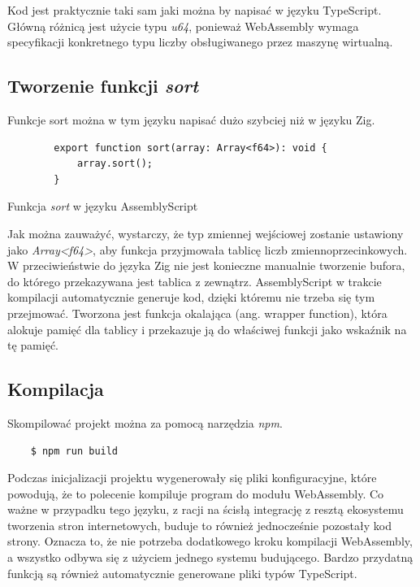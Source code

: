 \documentclass[language=polish,type=master]{aghmodern}
\begin{document}
Kod jest praktycznie taki sam jaki można by napisać w języku TypeScript.
Główną różnicą jest użycie typu \emph{u64}, ponieważ WebAssembly wymaga specyfikacji konkretnego typu liczby obsługiwanego przez maszynę wirtualną.

\subsection{Tworzenie funkcji \emph{sort}}

Funkcje sort można w tym języku napisać dużo szybciej niż w języku Zig.

\begin{listing}[H]
    \begin{verbatim}
        export function sort(array: Array<f64>): void {
            array.sort();
        }
    \end{verbatim}
    \caption{Funkcja \emph{sort} w języku AssemblyScript}
\end{listing}

Jak można zauważyć, wystarczy, że typ zmiennej wejściowej zostanie ustawiony jako \emph{Array<f64>}, aby funkcja przyjmowała tablicę liczb zmiennoprzecinkowych.
W przeciwieństwie do języka Zig nie jest konieczne manualnie tworzenie bufora, do którego przekazywana jest tablica z zewnątrz.
AssemblyScript w trakcie kompilacji automatycznie generuje kod, dzięki któremu nie trzeba się tym przejmować.
Tworzona jest funkcja okalająca (ang. wrapper function), która alokuje pamięć dla tablicy i przekazuje ją do właściwej funkcji jako wskaźnik na tę pamięć.

\subsection{Kompilacja}
Skompilować projekt można za pomocą narzędzia \emph{npm}.

\begin{verbatim}
    $ npm run build
\end{verbatim}

Podczas inicjalizacji projektu wygenerowały się pliki konfiguracyjne, które powodują, że to polecenie kompiluje program do modułu WebAssembly.
Co ważne w przypadku tego języku, z racji na ścisłą integrację z resztą ekosystemu tworzenia stron internetowych, buduje to również jednocześnie pozostały kod strony.
Oznacza to, że nie potrzeba dodatkowego kroku kompilacji WebAssembly, a wszystko odbywa się z użyciem jednego systemu budującego.
Bardzo przydatną funkcją są również automatycznie generowane pliki typów TypeScript.
\end{document}
